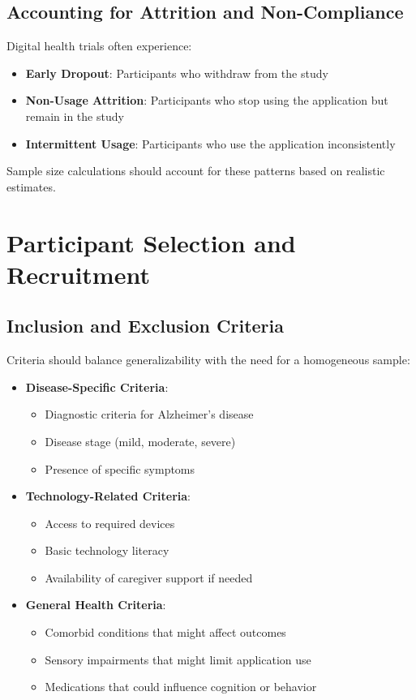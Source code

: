 \subsection{Accounting for Attrition and Non-Compliance}
Digital health trials often experience:

\begin{itemize}
    \item \textbf{Early Dropout}: Participants who withdraw from the study
    \item \textbf{Non-Usage Attrition}: Participants who stop using the application but remain in the study
    \item \textbf{Intermittent Usage}: Participants who use the application inconsistently
\end{itemize}

Sample size calculations should account for these patterns based on realistic estimates.

\section{Participant Selection and Recruitment}
\subsection{Inclusion and Exclusion Criteria}
Criteria should balance generalizability with the need for a homogeneous sample:

\begin{itemize}
    \item \textbf{Disease-Specific Criteria}:
    \begin{itemize}
        \item Diagnostic criteria for Alzheimer's disease
        \item Disease stage (mild, moderate, severe)
        \item Presence of specific symptoms
    \end{itemize}
    
    \item \textbf{Technology-Related Criteria}:
    \begin{itemize}
        \item Access to required devices
        \item Basic technology literacy
        \item Availability of caregiver support if needed
    \end{itemize}
    
    \item \textbf{General Health Criteria}:
    \begin{itemize}
        \item Comorbid conditions that might affect outcomes
        \item Sensory impairments that might limit application use
        \item Medications that could influence cognition or behavior
    \end{itemize}
\end{itemize}

